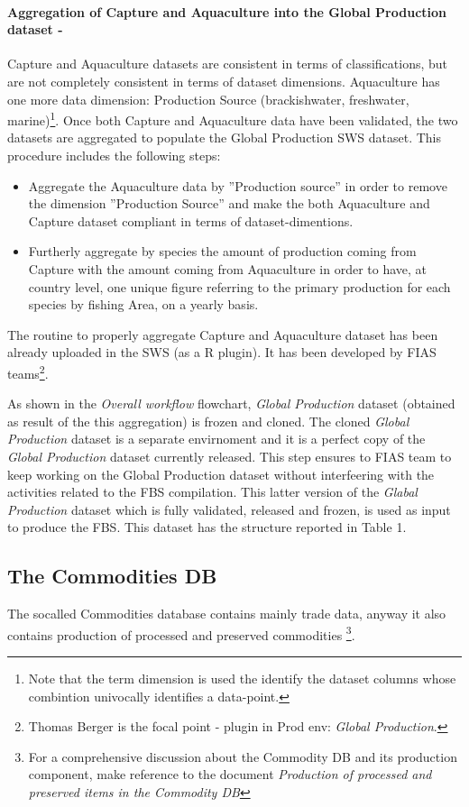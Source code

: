 \documentclass[nojss]{jss}
\begin{document}
\paragraph{Aggregation of Capture and Aquaculture into the Global Production dataset - }
Capture and Aquaculture datasets are consistent in terms of classifications, but are not completely consistent in terms of dataset dimensions. Aquaculture has one more data dimension: Production Source (brackishwater, freshwater, marine)\footnote{Note that the term dimension is used the identify the dataset columns whose combintion univocally identifies a data-point.}.
Once both Capture and Aquaculture data have been validated, the two datasets are aggregated to populate the Global Production SWS dataset. 
This procedure includes the following steps:
\begin{itemize}
\item Aggregate the Aquaculture data by ''Production source'' in order to remove the dimension ''Production Source'' and make the both Aquaculture and Capture dataset compliant in terms of dataset-dimentions.
\item Furtherly aggregate by species the amount of production  coming from Capture with the amount coming from Aquaculture in order to have, at country level, one unique figure referring to the primary production for each species by fishing Area, on a yearly basis.

\end{itemize}
The routine to properly aggregate Capture and Aquaculture dataset has been already uploaded in the SWS (as a R plugin). It has been developed by FIAS teams\footnote{Thomas Berger is the focal point - plugin in Prod env: \textit{Global Production}.}.

As shown in the \textit{Overall workflow} flowchart, \textit{Global Production} dataset (obtained as result of the this aggregation) is frozen and cloned. The cloned \textit{Global Production} dataset is a separate envirnoment and it is a perfect copy of the \textit{Global Production} dataset currently released. This step ensures to FIAS team to keep working on the Global Production dataset without interfeering with the activities related to the FBS compilation. This latter version of the \textit{Glabal Production} dataset which is fully validated, released and frozen, is used as input to produce the FBS. This dataset has the structure reported in Table 1.

\subsection {The Commodities DB}
The socalled  Commodities database contains mainly trade data, anyway it also contains production of processed and preserved commodities \footnote{For a comprehensive discussion about the Commodity DB and its production component, make reference to the document \textit{Production of processed and preserved items in the Commodity DB}}.
\end{document}
